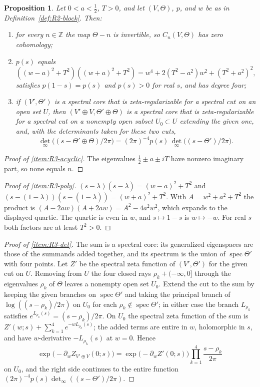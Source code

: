\documentclass[11pt]{amsart}
\theoremstyle{plain}
\newtheorem{proposition}[theorem]{Proposition}
\theoremstyle{definition}
\theoremstyle{remark}
\numberwithin{equation}{section}
\newcommand{\Z}{\mathbb{Z}}
\DeclareMathOperator{\spec}{spec}
\newcommand{\detreg}{{\det}_{\infty}}
\begin{document}
\begin{proposition}\label{prop:R3}
Let $0<a<\tfrac12$, $T>0$, and let $(V,\Theta)$, $p$, and $w$ be as in
Definition~\ref{def:R2-block}. Then:
\begin{enumerate}[label=(\roman*)]
\item\label{item:R3-acyclic} for every $n\in\Z$ the map $\Theta-n$ is
  invertible, so $C_n(V,\Theta)$ has zero cohomology;
\item\label{item:R3-poly} $p(s)$ equals
  \[
  ((w-a)^2+T^2)((w+a)^2+T^2)=w^4+2(T^2-a^2)w^2+(T^2+a^2)^2,
  \]
  satisfies $p(1-s)=p(s)$ and $p(s)>0$ for real $s$, and has degree
  four;
\item\label{item:R3-det} if $(V',\Theta')$ is a spectral core that is
  zeta-regularizable for a spectral cut on an open set $U$, then
  $(V'\oplus V,\Theta'\oplus\Theta)$ is a spectral core that is
  zeta-regularizable for a spectral cut on a nonempty open subset
  $U_0\subset U$ extending the given one, and, with the determinants
  taken for these two cuts,
  \[
  \detreg\bigl((s-\Theta'\oplus\Theta)/2\pi\bigr)
  =(2\pi)^{-4}p(s)\,\detreg\bigl((s-\Theta')/2\pi\bigr).
  \]
\end{enumerate}
\end{proposition}

\begin{proof}[Proof of \ref{item:R3-acyclic}]
The eigenvalues $\tfrac12\pm a\pm iT$ have nonzero imaginary part, so
none equals $n$.
\end{proof}

\begin{proof}[Proof of \ref{item:R3-poly}]
$(s-\lambda)(s-\bar\lambda)=(w-a)^2+T^2$ and
$(s-(1-\lambda))(s-(1-\bar\lambda))=(w+a)^2+T^2$. With
$A=w^2+a^2+T^2$ the product is $(A-2aw)(A+2aw)=A^2-4a^2w^2$, which
expands to the displayed quartic. The quartic is even in $w$, and
$s\mapsto1-s$ is $w\mapsto-w$. For real $s$ both factors are at least
$T^2>0$.
\end{proof}

\begin{proof}[Proof of \ref{item:R3-det}]
The sum is a spectral core: its generalized eigenspaces are those of
the summands added together, and its spectrum is the union of
$\spec\Theta'$ with four points. Let $Z'$ be the spectral zeta
function of $(V',\Theta')$ for the given cut on $U$. Removing from $U$
the four closed rays $\rho_k+(-\infty,0]$ through the eigenvalues
$\rho_k$ of $\Theta$ leaves a nonempty open set $U_0$. Extend the cut
to the sum by keeping the given branches on $\spec\Theta'$ and taking
the principal branch of $\log((s-\rho_k)/2\pi)$ on $U_0$ for each
$\rho_k\notin\spec\Theta'$; in either case the branch $L_{\rho_k}$
satisfies $e^{L_{\rho_k}(s)}=(s-\rho_k)/2\pi$. On $U_0$ the spectral
zeta function of the sum is
$Z'(w;s)+\sum_{k=1}^4e^{-wL_{\rho_k}(s)}$; the added terms are entire
in $w$, holomorphic in $s$, and have $w$-derivative $-L_{\rho_k}(s)$
at $w=0$. Hence
\[
\exp\bigl(-\partial_w Z_{V'\oplus V}(0;s)\bigr)
=\exp\bigl(-\partial_wZ'(0;s)\bigr)\prod_{k=1}^4\frac{s-\rho_k}{2\pi}
\]
on $U_0$, and the right side continues to the entire function
$(2\pi)^{-4}p(s)\detreg((s-\Theta')/2\pi)$.
\end{proof}
\end{document}
